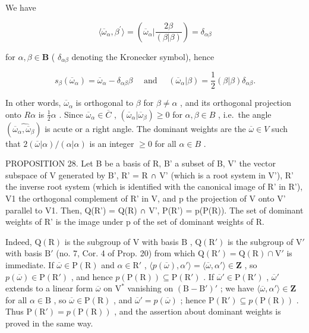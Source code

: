 We have

\[
\langle \overline {{{{\omega}}}} _ {\alpha}, \beta^ {\prime} \rangle = (\overline {{{{\omega}}}} _ {\alpha} | \frac {2 \beta}{(\beta | \beta)}) = \delta_ {\alpha \beta}
\]

for \(\alpha, \beta \in \mathbf{B}\) ( \(\delta_{\alpha\beta}\) denoting the Kronecker symbol), hence

\[
s _ {\beta} (\overline {{\omega}} _ {\alpha}) = \overline {{\omega}} _ {\alpha} - \delta_ {\alpha \beta} \beta \quad \text { and } \quad (\overline {{\omega}} _ {\alpha} | \beta) = \frac {1}{2} (\beta | \beta) \delta_ {\alpha \beta}.
\]

In other words, \(\overline{\omega}_{\alpha}\) is orthogonal to \(\beta\) for \(\beta \neq \alpha\) , and its orthogonal projection onto \(R\alpha\) is \(\frac{1}{2}\alpha\) . Since \(\overline{\omega}_{\alpha} \in \overline{C}\) , \((\overline{\omega}_{\alpha} | \overline{\omega}_{\beta}) \geqslant 0\) for \(\alpha, \beta \in B\) , i.e.~the angle \((\widehat{\overline{\omega}_{\alpha}, \overline{\omega}_{\beta}})\) is acute or a right angle. The dominant weights are the \(\overline{\omega} \in V\) such that \(2(\overline{\omega} | \alpha)/( \alpha | \alpha)\) is an integer \(\geqslant 0\) for all \(\alpha \in B\) .

PROPOSITION 28. Let B be a basis of R, B' a subset of B, V' the vector subspace of V generated by B', R' = R ∩ V' (which is a root system in V'), R' the inverse root system (which is identified with the canonical image of R' in R'), V1 the orthogonal complement of R' in V, and p the projection of V onto V' parallel to V1. Then, Q(R') = Q(R) ∩ V', P(R') = p(P(R)). The set of dominant weights of R' is the image under p of the set of dominant weights of R.

Indeed, \(\mathrm{Q}(\mathrm{R})\) is the subgroup of \(\mathrm{V}\) with basis \(\mathrm{B}\) , \(\mathrm{Q}(\mathrm{R}')\) is the subgroup of \(\mathrm{V}'\) with basis \(\mathrm{B}'\) (no. 7, Cor. 4 of Prop. 20) from which \(\mathrm{Q}(\mathrm{R}') = \mathrm{Q}(\mathrm{R}) \cap \mathrm{V}'\) is immediate. If \(\overline{\omega} \in \mathrm{P}(\mathrm{R})\) and \(\alpha \in \mathrm{R}'\) , \(\langle p(\overline{\omega}), \alpha' \rangle = \langle \overline{\omega}, \alpha' \rangle \in \mathbf{Z}\) , so \(p(\overline{\omega}) \in \mathrm{P}(\mathrm{R}')\) , and hence \(p(\mathrm{P}(\mathrm{R})) \subseteq \mathrm{P}(\mathrm{R}')\) . If \(\overline{\omega}' \in \mathrm{P}(\mathrm{R}')\) , \(\overline{\omega}'\) extends to a linear form \(\overline{\omega}\) on \(\mathrm{V}^*\) vanishing on \((\mathrm{B} - \mathrm{B}')'\) ; we have \(\langle \overline{\omega}, \alpha' \rangle \in \mathbf{Z}\) for all \(\alpha \in \mathrm{B}\) , so \(\overline{\omega} \in \mathrm{P}(\mathrm{R})\) , and \(\overline{\omega}' = p(\overline{\omega})\) ; hence \(\mathrm{P}(\mathrm{R}') \subseteq p(\mathrm{P}(\mathrm{R}))\) . Thus \(\mathrm{P}(\mathrm{R}') = p(\mathrm{P}(\mathrm{R}))\) , and the assertion about dominant weights is proved in the same way.

